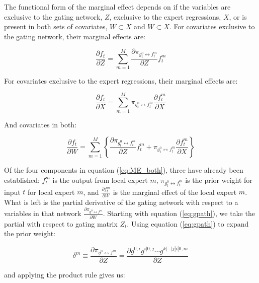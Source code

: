 \documentclass[12pt]{article}
\newcommand{\gateprod}[2]{\pi_{#1 \longleftrightarrow #2}}
\begin{document}
The functional form of the marginal effect depends on if the variables are
exclusive to the gating network, $Z$, exclusive to the expert
regressions, $X$, or is present in both sets of covariates,
$W \subset X$ and $W \subset X$. For covariates
exclusive to the gating network, their marginal effects are:

\begin{equation} \label{eq:ME_gating}
  \frac{\partial f_{t}}{\partial Z} = \sum_{m=1}^{M} \frac{\partial \gateprod{g^{0}_{t}}{f^{m}_{t}}}{{\partial Z}}f^{m}_{t}
\end{equation}

For covariates exclusive to the expert regressions, their marginal effects
are:

\begin{equation} \label{eq:ME_expert}
  \frac{\partial f_{t}}{\partial X} = \sum_{m=1}^{M} \gateprod{g^{0}_{t}}{f^{m}_{t}} \frac{\partial f^{m}_{t}}{{\partial X}}
\end{equation}

And covariates in both:

\begin{equation} \label{eq:ME_both}
  \frac{\partial f_{t}}{\partial W} = \sum_{m=1}^{M} \left\{ \frac{\partial \gateprod{g^{0}_{t}}{f^{m}_{t}}}{{\partial Z}}f^{m}_{t} + \gateprod{g^{0}_{t}}{f^{m}_{t}} \frac{\partial f^{m}_{t}}{{\partial X}} \right\}
\end{equation}

Of the four components in equation (\ref{eq:ME_both}), three have already
been established: $f_{t}^{m}$ is the output from local expert $m$,
$\gateprod{g^{0}_{t}}{f^{m}_{t}}$ is the prior weight for input $t$
for local expert $m$, and $\frac{\partial f^{m}_{t}}{{\partial W}}$
is the marginal effect of the local expert $m$. What is left is the
partial derivative of the gating network with respect to a variables
in that network $\frac{\partial \gateprod{g^{0}}{f^{m}}}{\partial W}$.
Starting with equation (\ref{eq:gpath}), we take the partial with
respect to gating matrix $Z_{t}$. Using equation (\ref{eq:gpath})
to expand the prior weight:

\begin{equation}
  \delta^{m} \equiv \frac{\partial \gateprod{g^{0}}{f^{m}}}{\partial Z} = \frac{\partial g^{0, i} g^{i|0, j} \cdots g^{k|\cdots|j|i|0, m}}{\partial Z}
\end{equation}

and applying the product rule gives us:
\end{document}
